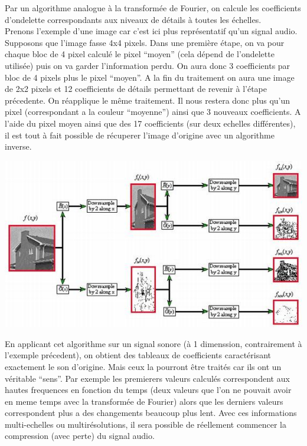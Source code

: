 \documentclass[a4paper,12pt]{article}
\begin{document}
Par un algorithme analogue à la transformée de Fourier, on calcule les
coefficients d'ondelette correspondants aux niveaux de détails à toutes les
échelles.\\
Prenons l'exemple d'une image car c'est ici plus représentatif qu'un signal
audio. Supposons que l'image fasse 4x4 pixels. Dans une première étape, on va
pour chaque bloc de 4 pixel calculé le pixel ``moyen'' (cela dépend de
l'ondelette utilisée) puis on va garder l'information perdu. On aura donc 3
coefficients par bloc de 4 pixels plus le pixel ``moyen''. A la fin du
traitement on aura une image de 2x2 pixels et 12 coefficients de détails
permettant de revenir à l'étape précedente. On réapplique le même traitement. Il
nous restera donc plus qu'un pixel (correspondant a la couleur ``moyenne'')
ainsi que 3 nouveaux coefficients. A l'aide du pixel moyen ainsi que des 17
coefficients (sur deux echelles différentes), il est tout à fait possible de
récuperer l'image d'origine avec un algorithme inverse.
\begin{center}
\includegraphics[scale=0.50]{img/ondelettes.jpg}
\end{center}
En applicant cet algorithme sur un signal sonore (à 1 dimenssion,
contrairement à l'exemple précedent), on obtient des tableaux de
coefficients caractérisant exactement le son d'origine. Mais ceux la
pourront être traités car ils ont un véritable ``sens''. Par exemple
les premierers valeurs calculés correspondent aux hautes frequences en
fonction du temps (deux valeurs que l'on ne pouvait avoir en meme
temps avec la transformée de Fourier) alors que les derniers valeurs
correspondent plus a des changements beaucoup plus lent. Avec ces
informations multi-echelles ou multirésolutions, il sera possible de
réellement commencer la compression (avec perte) du signal audio.
\end{document}
